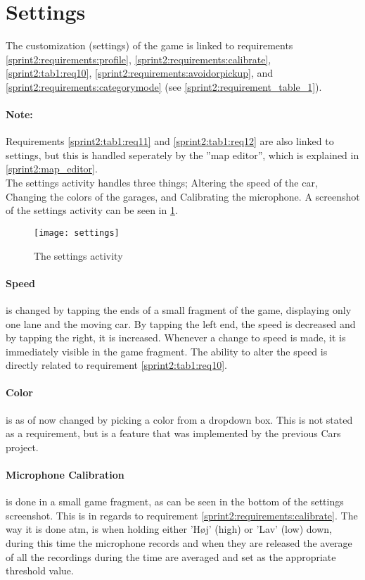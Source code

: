 \section{Settings}

The customization (settings) of the game is linked to requirements \ref{sprint2:requirements:profile}, \ref{sprint2:requirements:calibrate}, \ref{sprint2:tab1:req10}, \ref{sprint2:requirements:avoidorpickup}, and \ref{sprint2:requirements:categorymode} (see \cref{sprint2:requirement_table_1}).

\paragraph{Note:} Requirements \ref{sprint2:tab1:req11} and \ref{sprint2:tab1:req12} are also linked to settings, but this is handled seperately by the ''map editor'', which is explained in \cref{sprint2:map_editor}.\\

\noindent
The settings activity handles three things; Altering the speed of the car, Changing the colors of the garages, and Calibrating the microphone.
A screenshot of the settings activity can be seen in \cref{sprint2:settings:fig}.
\begin{center}
\begin{figure}
\texttt{[image: settings]}
\caption{The settings activity}
\label{sprint2:settings:fig}
\end{figure}
\end{center}
\paragraph{Speed} is changed by tapping the ends of a small fragment of the game, displaying only one lane and the moving car.
By tapping the left end, the speed is decreased and by tapping the right, it is increased.
Whenever a change to speed is made, it is immediately visible in the game fragment.
The ability to alter the speed is directly related to requirement \ref{sprint2:tab1:req10}.

\paragraph{Color} is as of now changed by picking a color from a dropdown box.
This is not stated as a requirement, but is a feature that was implemented by the previous Cars project.

\paragraph{Microphone Calibration} is done in a small game fragment, as can be seen in the bottom of the settings screenshot.
This is in regards to requirement \ref{sprint2:requirements:calibrate}.
The way it is done atm, is when holding either 'H\o j' (high) or 'Lav' (low) down, during this time the microphone records and when they are released the average of all the recordings during the time are averaged and set as the appropriate threshold value.


